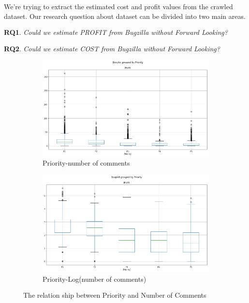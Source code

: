 We're trying to extract the estimated cost and profit values from the crawled dataset. Our research question about dataset can be divided into two main areas.

\textbf{RQ1}. \textit{Could we estimate PROFIT from Bugzilla without Forward Looking?}

\textbf{RQ2}. \textit{Could we estimate COST from Bugzilla without Forward Looking?}
\begin{figure}[h]
\centering
  \begin{subfigure}[b]{0.45\linewidth}
    \includegraphics[width=\linewidth]{images/boxplotraw.png}
    \caption{Priority-number of comments}
  \end{subfigure}
  \begin{subfigure}[b]{0.45\linewidth}
    \includegraphics[width=\linewidth]{images/boxplot.png}
    \caption{Priority-Log(number of comments)}
  \end{subfigure}
  \caption{The relation ship between Priority and Number of Comments}
  \label{fig:priority_comments}
\end{figure}
